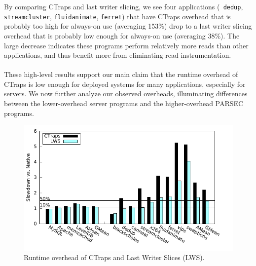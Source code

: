 \documentclass[preprint,9pt]{sigplanconf}
\newcommand{\ctraps}{CTraps\xspace}
\newcommand{\ctrapsfull}{CTraps-Full\xspace}
\newcommand{\ctrapsmm}{CTraps-NRR\xspace}
\begin{document}
By comparing \ctraps and last writer slicing, we see four applications ({\tt
dedup}, {\tt streamcluster}, {\tt fluidanimate}, {\tt ferret}) that have
\ctraps overhead that is probably too high for always-on use (averaging 153\%)
drop to a last writer slicing overhead that is probably low enough for always-on use
(averaging 38\%).  The large decrease indicates these programs perform
relatively more reads than other applications, and thus benefit more from
eliminating read instrumentation.
\\
\\
These high-level results support our main claim that the runtime overhead of
\ctraps is low enough for deployed systems for many 
applications, especially for servers.  We now further analyze our observed overheads, illuminating
differences between the lower-overhead server programs and the higher-overhead
PARSEC programs.

\begin{figure}
\centering
\includegraphics[width=.9\columnwidth]{plots/perf.pdf}
\caption{\label{fig:perfall}Runtime overhead of \ctraps and Last Writer Slices (LWS).}
\end{figure}
\end{document}
